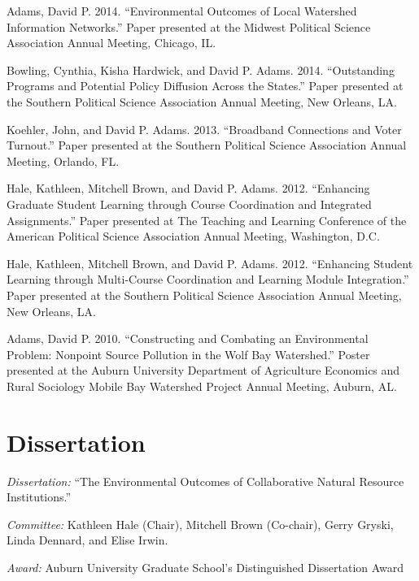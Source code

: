 \documentclass[11pt,letterpaper]{article}
\renewenvironment{itemize}{
  \begin{list}{}{
    \setlength{\leftmargin}{1.5em}
    \setlength{\itemsep}{0.25em}
    \setlength{\parskip}{0pt}
    \setlength{\parsep}{0.25em}
  }
}{
  \end{list}
}
\begin{document}
\begin{itemize}
    \item Adams, David P. 2014. ``Environmental Outcomes of Local Watershed Information Networks.'' Paper presented at the Midwest Political Science Association Annual Meeting, Chicago, IL.
    
    \item Bowling, Cynthia, Kisha Hardwick, and David P. Adams. 2014. ``Outstanding Programs and Potential Policy Diffusion Across the States.'' Paper presented at the Southern Political Science Association Annual Meeting, New Orleans, LA.
    
    \item Koehler, John, and David P. Adams. 2013. ``Broadband Connections and Voter Turnout.'' Paper presented at the Southern Political Science Association Annual Meeting, Orlando, FL.
    
    \item Hale, Kathleen, Mitchell Brown, and David P. Adams. 2012. ``Enhancing Graduate Student Learning through Course Coordination and Integrated Assignments.'' Paper presented at The Teaching and Learning Conference of the American Political Science Association Annual Meeting, Washington, D.C.
    
    \item Hale, Kathleen, Mitchell Brown, and David P. Adams. 2012. ``Enhancing Student Learning through Multi-Course Coordination and Learning Module Integration.'' Paper presented at the Southern Political Science Association Annual Meeting, New Orleans, LA.
    
    \item Adams, David P. 2010. ``Constructing and Combating an Environmental Problem: Nonpoint Source Pollution in the Wolf Bay Watershed.'' Poster presented at the Auburn University Department of Agriculture Economics and Rural Sociology Mobile Bay Watershed Project Annual Meeting, Auburn, AL.
  \end{itemize}
  

\section*{Dissertation}
    \begin{itemize}\leftmargin=2pt\itemindent=-15pt\leftmargin=2pt\itemindent=-15pt
        \item \emph{Dissertation:} ``The Environmental Outcomes of Collaborative Natural Resource Institutions.'' 
        \item \emph{Committee:} Kathleen Hale (Chair), Mitchell Brown (Co-chair),
        Gerry Gryski, \\Linda Dennard, and Elise Irwin.
        \item \emph{Award:} Auburn University Graduate School's Distinguished Dissertation Award
    \end{itemize}
		
\end{document}
